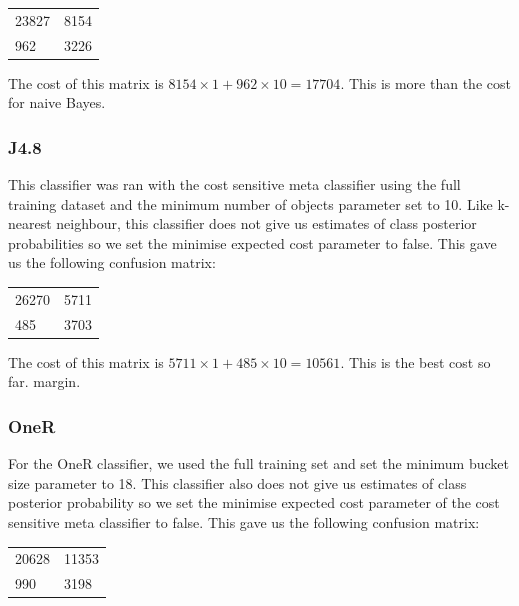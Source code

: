 \documentclass[a4paper,11pt]{article}
\begin{document}
\begin{table}[H]
  \begin{center}
    \begin{tabular}{l l }
      23827 & 8154 \\
      962 & 3226 \\
    \end{tabular}
  \end{center}
  \label{tab:kNNCost}
\end{table}

The cost of this matrix is $ 8154 \times 1 + 962 \times 10 = 17704 $. This is more than the cost for naive Bayes.

\subsubsection{J4.8}
This classifier was ran with the cost sensitive meta classifier using the full training dataset and the minimum
number of objects parameter set to 10. Like k-nearest neighbour, this classifier does not give us estimates of
class posterior probabilities so we set the minimise expected cost parameter to false. This gave us the following
confusion matrix:

\begin{table}[H]
  \begin{center}
    \begin{tabular}{l l }
      26270 & 5711 \\
      485 & 3703 \\
    \end{tabular}
  \end{center}
  \label{tab:J48Cost}
\end{table}

The cost of this matrix is $ 5711 \times 1 + 485 \times 10 = 10561 $. This is the best cost so far.
margin.

\subsubsection{OneR}
For the OneR classifier, we used the full training set and set the minimum bucket size parameter to 18. This
classifier also does not give us estimates of class posterior probability so we set the minimise expected cost
parameter of the cost sensitive meta classifier to false. This gave us the following confusion matrix:

\begin{table}[H]
  \begin{center}
    \begin{tabular}{l l }
      20628 & 11353 \\
      990 & 3198 \\
    \end{tabular}
  \end{center}
  \label{tab:OneRCost}
\end{table}
\end{document}
